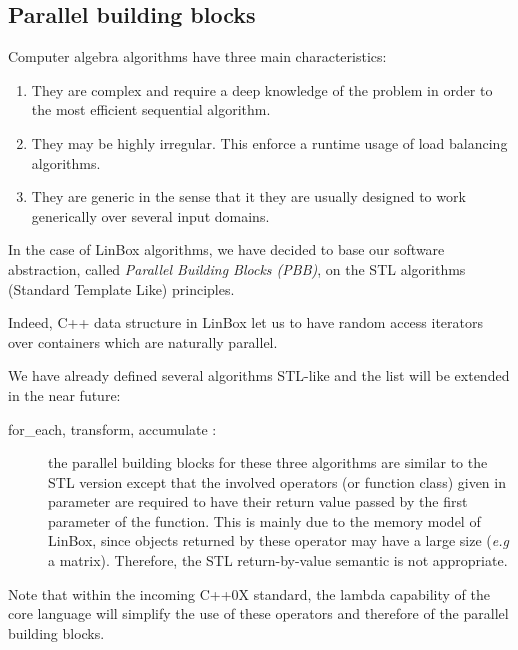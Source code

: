 \documentclass[runningheads,a4paper]{llncs}
\newcommand{\linboxsp}{{\sc LinBox}\xspace}
\begin{document}
\subsection{Parallel building blocks}
Computer algebra algorithms have three main characteristics:
\begin{enumerate}
\item They are complex and require a deep knowledge of the problem in
  order to the most efficient sequential algorithm.
\item They may be highly irregular. This enforce a runtime usage of
  load balancing algorithms.
\item They are generic in the sense that it they are usually designed
  to work generically over several input domains.
\end{enumerate}

  In the case of \linboxsp algorithms, we have decided to base our
  software abstraction, called {\em Parallel Building Blocks (PBB)},
  on the STL algorithms (Standard Template Like) principles.

  Indeed, C++ data structure in \linboxsp let us to have random access
  iterators over containers which are naturally parallel. 
  
  We have already defined several algorithms STL-like and the list
  will be extended in the near future:
  \begin{description} 
    
  \item [for\_each, transform, accumulate \cite{Musser:1996:STL}:] the parallel building
    blocks for these three algorithms are similar to the STL version 
    except that the involved operators (or function class) given in
    parameter are required to have their return value passed by the
    first parameter of the function. 
    This is mainly due to the memory model of \linboxsp, since objects
    returned by these operator may have a large size (\textit{e.g} a
    matrix).
    Therefore, the STL return-by-value semantic is not appropriate. 
  \end{description} 
  
  Note that within the incoming C++0X standard, the lambda capability
  of the core language will simplify the use of these operators and
  therefore of the parallel
  building blocks.


  
\end{document}
